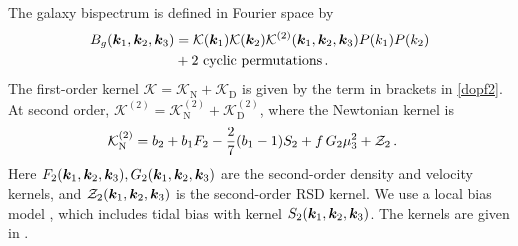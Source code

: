 The galaxy bispectrum  is defined in Fourier space by
\begin{align}
B_{g}( \bm{k}_{1},  \bm{k}_{2},  \bm {k}_3) &= { \mathcal{K}( \bm {k}_{1})\mathcal{K}({\bm {k}}_{2}) \mathcal{K}^{(2)}(  \bm{k}_{1},  \bm{k}_{2}, \bm {k}_3)}
P(k_{1})P(k_{2}) \nonumber\\ 
&+\text{2 cyclic permutations}\,.\label{b6}
\end{align}
 The first-order kernel $\mathcal{K}=\mathcal{K}_{\mathrm{N}}+\mathcal{K}_{\mathrm{D}}$ is given by the term in brackets in \eqref{dopf2}.
At second order, $\mathcal{K}^{(2)}=\mathcal{K}_{\mathrm{N}}^{(2)}+\mathcal{K}_{\mathrm{D}}^{(2)}$, where
 the Newtonian kernel is~\citep{Verde:1998zr}
\begin{align}
&\mathcal{K}_{\mathrm{N}}^{(2)}%
= b_{2}+ b_{1}F_{2}%
 -{\frac{2}{7}}(b_1-1)S_{2}
+ f\,G_{2}%
\mu_3^{2}
+ {\cal Z}_2%
\,.   \label{kn2}  %
\end{align}
Here $F_2({\bm {k}_{1}},  {\bm {k}_{2}},\bm {k}_3),G_2({\bm {k}_{1}},  {\bm {k}_{2}},\bm {k}_3)$ are the second-order density and velocity kernels, and ${\cal Z}_2({\bm {k}_{1}},  {\bm {k}_{2}},\bm {k}_3)$ is the second-order  RSD kernel. We use a local bias model \citep{Desjacques:2016bnm}, which includes tidal bias with kernel  $S_2({\bm {k}_{1}},  {\bm {k}_{2}},\bm {k}_3)$. The kernels are given in \citet{Tellarini:2016sgp}.

